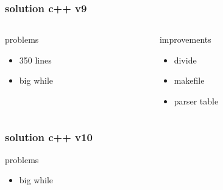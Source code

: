 \begin{frame}
    \frametitle{solution c++ v9}
    \begin{columns}
        \begin{column}{.48\textwidth}
            problems
            \begin{itemize}
                \item 350 lines
                \item big while
            \end{itemize}
        \end{column}
        \begin{column}{.48\textwidth}
            improvements
            \begin{itemize}
                \item divide
                \item makefile
                \item parser table
            \end{itemize}
        \end{column}
    \end{columns}
\end{frame}

\begin{frame}
    \frametitle{solution c++ v10}
    problems
    \begin{itemize}
        \item big while
    \end{itemize}
\end{frame}
